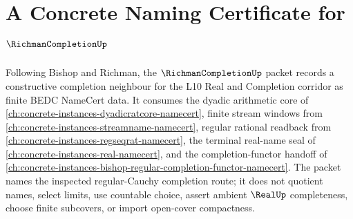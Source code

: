 \chapter{A Concrete Naming Certificate for $\RichmanCompletionUp$}
\label{ch:concrete-instances-richman-completion-namecert}

Following Bishop and Richman, the $\RichmanCompletionUp$ packet records a constructive completion neighbour for the L10 Real and Completion corridor as finite BEDC NameCert data. It consumes the dyadic arithmetic core of \autoref{ch:concrete-instances-dyadicratcore-namecert}, finite stream windows from \autoref{ch:concrete-instances-streamname-namecert}, regular rational readback from \autoref{ch:concrete-instances-regseqrat-namecert}, the terminal real-name seal of \autoref{ch:concrete-instances-real-namecert}, and the completion-functor handoff of \autoref{ch:concrete-instances-bishop-regular-completion-functor-namecert}. The packet names the inspected regular-Cauchy completion route; it does not quotient names, select limits, use countable choice, assert ambient $\RealUp$ completeness, choose finite subcovers, or import open-cover compactness.

